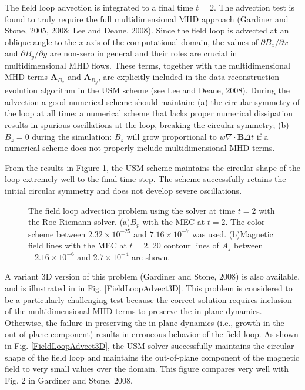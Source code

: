 The field loop advection is integrated to a final time $t=2$. The
advection test is found to truly require the full multidimensional MHD
approach (Gardiner and Stone, 2005, 2008; Lee and Deane, 2008). Since
the field loop is advected at an oblique angle to the $x$-axis of the
computational domain, the values of $\partial B_x / \partial x$ and
$\partial B_y / \partial y$ are non-zero in general and their roles are
crucial in multidimensional MHD flows.
These terms, together with the multidimensional MHD terms $\mathbf{A}_{B_x}$ and
$\mathbf{A}_{B_y}$, are explicitly included in the data
reconstruction-evolution algorithm in the USM scheme (see Lee and Deane, 2008). 
During the advection a good
numerical scheme should maintain: (a) the circular symmetry of the
loop at all time: a numerical scheme that lacks proper numerical
dissipation results in spurious oscillations at the loop, breaking the
circular symmetry; (b) $B_z=0$ during the simulation: $B_z$ will grow
proportional to $w\nabla \cdot \mathbf{B}\Delta t$ if a numerical
scheme does not properly include multidimensional MHD terms.


From the results in Figure {\ref{FieldLoopAdvect}}, the USM scheme
maintains the circular shape of the loop extremely well to the final
time step. The scheme successfully retains the initial circular
symmetry and does not develop severe oscillations.

\label{Sec:SimulationFieldLoop}
\begin{figure}[htbp]
\begin{center}
    {}
    {}
\end{center}
\caption{The field loop advection problem using the  solver at time $t=2$ with the Roe Riemann solver. (a)$B_p$ with the MEC at $t=2$. The color scheme between $2.32\times10^{-25}$ and $7.16\times10^{-7}$ was used. (b)Magnetic field lines with the MEC at $t=2$. 20 contour lines of $A_z$ between $-2.16\times 10^{-6}$ and $2.7\times10^{-4}$ are shown.}
\label{FieldLoopAdvect}
\end{figure}

A variant 3D version of this problem (Gardiner and Stone, 2008) is also available, and is illustrated in
in Fig. {\ref{FieldLoopAdvect3D}}.
This problem is considered to be a particularly challenging test 
because the correct solution requires inclusion of the multidimensional MHD terms to 
preserve the in-plane dynamics. Otherwise, the failure in preserving the in-plane
dynamics (i.e., growth in the out-of-plane component) results in erroneous behavior of the field loop.
As shown in Fig. {\ref{FieldLoopAdvect3D}}, the USM solver successfully 
maintains the circular shape of the field loop and 
maintains the out-of-plane component of the magnetic
field to very small values over the domain. This figure compares very well with Fig. 2 in
Gardiner and Stone, 2008.


